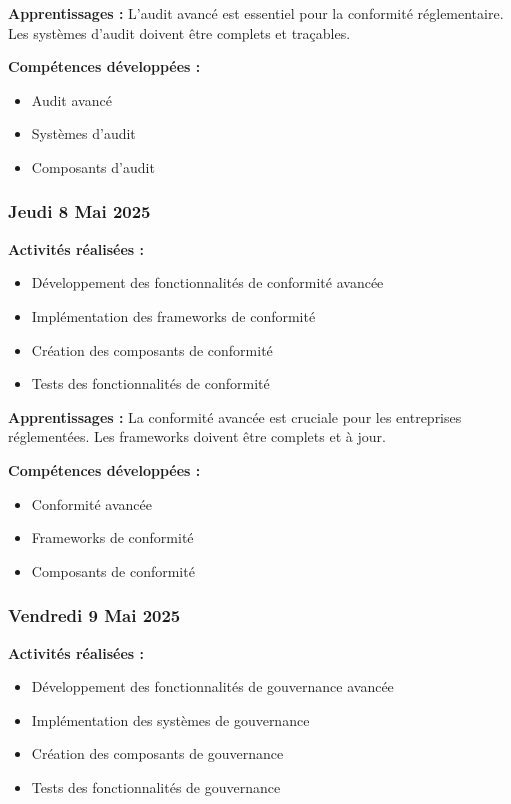 \documentclass[12pt,a4paper]{article}
\begin{document}
\textbf{Apprentissages :}
L'audit avancé est essentiel pour la conformité réglementaire. Les systèmes d'audit doivent être complets et traçables.

\textbf{Compétences développées :}
\begin{itemize}
    \item Audit avancé
    \item Systèmes d'audit
    \item Composants d'audit
\end{itemize}

\subsubsection{Jeudi 8 Mai 2025}
\textbf{Activités réalisées :}
\begin{itemize}
    \item Développement des fonctionnalités de conformité avancée
    \item Implémentation des frameworks de conformité
    \item Création des composants de conformité
    \item Tests des fonctionnalités de conformité
\end{itemize}

\textbf{Apprentissages :}
La conformité avancée est cruciale pour les entreprises réglementées. Les frameworks doivent être complets et à jour.

\textbf{Compétences développées :}
\begin{itemize}
    \item Conformité avancée
    \item Frameworks de conformité
    \item Composants de conformité
\end{itemize}

\subsubsection{Vendredi 9 Mai 2025}
\textbf{Activités réalisées :}
\begin{itemize}
    \item Développement des fonctionnalités de gouvernance avancée
    \item Implémentation des systèmes de gouvernance
    \item Création des composants de gouvernance
    \item Tests des fonctionnalités de gouvernance
\end{itemize}
\end{document}
